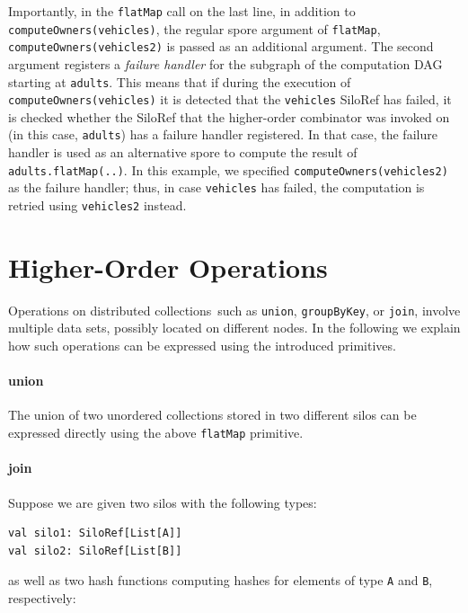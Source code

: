 \documentclass[preprint]{sigplanconf}
\theoremstyle{definition}
\theoremstyle{definition}
\begin{document}
Importantly, in the \verb|flatMap| call on the last line, in addition to
\verb|computeOwners(vehicles)|, the regular spore argument of \verb|flatMap|,
\verb|computeOwners(vehicles2)| is passed as an additional argument. The
second argument registers a \emph{failure handler} for the subgraph of the
computation DAG starting at \verb|adults|. This means that if during the
execution of \verb|computeOwners(vehicles)| it is detected that the
\verb|vehicles| SiloRef has failed, it is checked whether the SiloRef that the
higher-order combinator was invoked on (in this case, \verb|adults|) has a
failure handler registered. In that case, the failure handler is used as an
alternative spore to compute the result of \verb|adults.flatMap(..)|. In this
example, we specified \verb|computeOwners(vehicles2)| as the failure handler;
thus, in case \verb|vehicles| has failed, the computation is retried using
\verb|vehicles2| instead.





\section{Higher-Order Operations}
\label{sec:higher-order-operations}

Operations on distributed collections~such as \verb|union|, \verb|groupByKey|, or
\verb|join|, involve multiple data sets, possibly located on different nodes.
In the following we explain how such operations can be expressed using the
introduced primitives.

\paragraph{union}
The union of two unordered collections stored in two different silos can be
expressed directly using the above \verb|flatMap| primitive.

\paragraph{join}
Suppose we are given two silos with the following types:

\begin{lstlisting}
val silo1: SiloRef[List[A]]
val silo2: SiloRef[List[B]]
\end{lstlisting}

\noindent as well as two hash functions computing hashes for elements of
type \verb|A| and \verb|B|, respectively:
\end{document}
